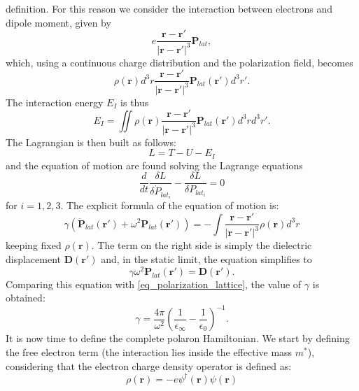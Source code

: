 definition. For this reason we consider the interaction between electrons and dipole moment, given by
\begin{equation}
    e\frac{\mathbf{r}-\mathbf{r}'}{|\mathbf{r}-\mathbf{r}'|^3}\mathbf{P}_{lat},
\end{equation}
which, using a continuous charge distribution and the polarization field, becomes
\begin{equation}
    \rho(\mathbf{r})d^3r\frac{\mathbf{r}-\mathbf{r}'}{|\mathbf{r}-\mathbf{r}'|^3}\mathbf{P}_{lat}(\mathbf{r}')d^3r'.
\end{equation}
The interaction energy $E_I$ is thus
\begin{equation}
    E_I=\iint \rho(\mathbf{r})\frac{\mathbf{r}-\mathbf{r}'}{|\mathbf{r}-\mathbf{r}'|^3}\mathbf{P}_{lat}(\mathbf{r}')d^3rd^3r'.
\end{equation}
The Lagrangian is then built as follows:
\begin{equation}
    L=T-U-E_I
\end{equation}
and the equation of motion are found solving the Lagrange equations
\begin{equation}
    \frac{d}{dt}\frac{\delta L}{\delta \dot{P}_{lat_i}}-\frac{\delta L}{\delta P_{lat_i}}=0
\end{equation}
for $i=1,2,3$. The explicit formula of the equation of motion is:
\begin{equation}
    \gamma(\ddot{\mathbf{P}}_{lat}(\mathbf{r}')+\omega^2\mathbf{P}_{lat}(\mathbf{r}'))=-\int \frac{\mathbf{r}-\mathbf{r}'}{|\mathbf{r}-\mathbf{r'}|^3}\rho(\mathbf{r})d^3r
\end{equation}
keeping fixed $\rho(\mathbf{r})$. The term on the right side is simply the dielectric displacement $\mathbf{D}(\mathbf{r}')$ and, in the 
static limit, the equation simplifies to
\begin{equation}
    \gamma\omega^2\mathbf{P}_{lat}(\mathbf{r}')=\mathbf{D}(\mathbf{r}').
\end{equation}
Comparing this equation with \ref{eq_polarization_lattice}, the value of $\gamma$ is obtained:
\begin{equation}
    \gamma = \frac{4\pi}{\omega^2}\left(\frac{1}{\epsilon_\infty}-\frac{1}{\epsilon_0}\right)^{-1}.
\end{equation}
It is now time to define the complete polaron Hamiltonian. We start by defining the free electron term (the interaction lies inside 
the effective mass $m^*$), considering that the electron charge density operator is defined as:
\begin{equation}
    \rho(\mathbf{r})=-e\psi^\dagger(\mathbf{r})\psi(\mathbf{r})
\end{equation}
